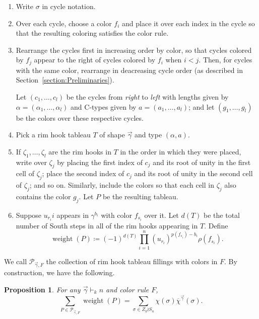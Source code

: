 \documentclass[a4paper,12pt]{amsart}
\theoremstyle{plain}
\newtheorem{proposition}[theorem]{Proposition}
\theoremstyle{definition}
\theoremstyle{remark}
\DeclareMathOperator{\weight}{weight}
\begin{document}
\begin{enumerate}
\item Write $\sigma$ in cycle notation.
\item Over each cycle, choose a color $f_i$ and place it over each index in the cycle so that the resulting coloring satisfies the color rule.

\item Rearrange the cycles first in increasing order by color, so that cycles colored by $f_j$ appear to the right of cycles colored by $f_i$ when $i<j$.
Then, for cycles with the same color, rearrange in deacreasing cycle order (as described in Section~\ref{section:Preliminaries}). 

Let $(c_1,\dots, c_l)$ be the cycles from {\emph{ right}} to {\emph{left}} with lengths given by 
$\alpha = (\alpha_1,\dots,\alpha_l)$ and C-types given by $a =(a_1,\dots,a_l)$; and let $(g_1,\dots, g_l)$ be the colors over these respective cycles.

\item Pick a rim hook tableau $T$ of shape $\vec{\gamma}$ and type $(\alpha,a).$

\item If $\zeta_1, \dots, \zeta_l$ are the rim hooks in $T$ in the order in which they were placed, write over $\zeta_j$ by placing the first index of $c_j$ and its root of unity in the first cell of $\zeta_j$; place the second index of $c_j$ and its root of unity in the second cell of $\zeta_j$; and so on.  Similarly, include the colors so that each cell in $\zeta_j$ also contains the color $g_j$. Let $P$ be the resulting tableau.

\item Suppose $u_{r_i} i$ appears in $\gamma^{b_i}$ with color $f_{s_i}$ over it. Let $d(T)$ be the total number of South steps in all of the rim hooks appearing in $T$. Define
\[
\weight(P) \coloneq (-1)^{d(T)} \prod_{i=1}^n (u_{r_i})^{p(f_{s_i})-b_i} \rho(f_{s_i}).
\]
\end{enumerate}
 We call $\mathcal{P}_{\vec{\gamma},F}$ the collection of rim hook tableau fillings with colors in $F$. By construction, we have the following.
 \begin{proposition} \label{proposition:combiantorialexpansion}
For any $\vec{\gamma} \vdash_k n$ and color rule $F$,
\[
\sum_{P \in \mathcal{P}_{\vec{\gamma},F}}\weight(P) =  \sum_{\sigma \in Z_k \wr S_n} 
\chi(\sigma) \overline{\chi}^{\vec{\gamma}}(\sigma).
\]
 \end{proposition}
\end{document}
